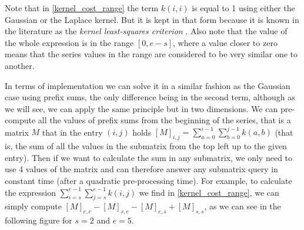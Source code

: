 \documentclass[pdflatex,sn-mathphys]{sn-jnl}%
\theoremstyle{thmstyleone}%
\theoremstyle{thmstyletwo}%
\theoremstyle{thmstylethree}%
\begin{document}
Note that in \ref{kernel_cost_range} the term $k(i,i)$ is equal to 1 using either the Gaussian or the Laplace kernel. But it is kept in that form because it is known in the literature as the \textit{kernel least-squares criterion} \citep{arlot}. Also note that the value of the whole expression is in the range $[0, e-s]$, where a value closer to zero means that the series values in the range are considered to be very similar one to another.

In terms of implementation we can solve it in a similar fashion as the Gaussian case using prefix sums, the only difference being in the second term, although as we will see, we can apply the same principle but in two dimensions. We can pre-compute all the values of prefix sums from the beginning of the series, that is a matrix $M$ that in the entry $(i,j)$ holds $[M]_{i,j} = \sum\limits_{a=0}^{i-1}\sum\limits_{b=0}^{j-1} k(a,b)$ (that is, the sum of all the values in the submatrix from the top left up to the given entry). Then if we want to calculate the sum in any submatrix, we only need to use 4 values of the matrix and can therefore answer any submatrix query in constant time (after a quadratic pre-processing time). For example, to calculate the expression $\sum\limits_{i=s}^{e-1}\sum\limits_{j=s}^{e-1}k(i,j)$ we find in \ref{kernel_cost_range}, we can simply compute $[M]_{e,e} - [M]_{s,e} - [M]_{e,s} + [M]_{s,s}$, as we can see in the following figure for $s = 2$ and $e = 5$.

\medskip
\end{document}
